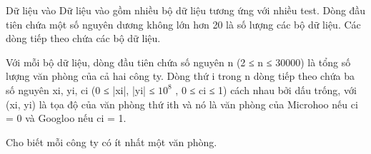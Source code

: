 Dữ liệu vào
Dữ liệu vào gồm nhiều bộ dữ liệu tương ứng với nhiều test. Dòng đầu tiên chứa một số nguyên dương không lớn hơn 20 là số lượng các bộ dữ liệu. Các dòng tiếp theo chứa các bộ dữ liệu.  

   Với mỗi bộ dữ liệu, dòng đầu tiên chứa số nguyên n (2 ≤ n ≤ 30000) là tổng số lượng văn phòng của cả hai công ty. Dòng thứ i trong n dòng tiếp theo chứa ba số nguyên xi, yi, ci (0 ≤ |xi|, |yi| ≤ $10^{8}$   , 0 ≤ ci ≤ 1) cách nhau bởi dấu trống, với (xi, yi) là tọa độ của văn phòng thứ ith và nó là văn phòng của Microhoo nếu ci = 0 và Googloo nếu ci = 1.  

   Cho biết mỗi công ty có ít nhất một văn phòng.